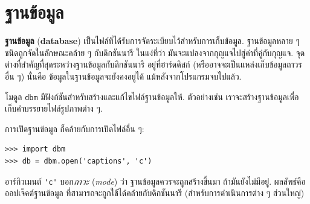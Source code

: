 \section{ฐานข้อมูล}


\textbf{ฐานข้อมูล} (\textbf{database}) เป็นไฟล์ที่ได้รับการจัดระเบียบไว้สำหรับการเก็บข้อมูล.
ฐานข้อมูลหลาย ๆ ชนิดถูกจัดในลักษณะคล้าย ๆ กับดิกชันนารี
ในแง่ที่ว่า มันจะแปลงจากกุญแจไปสู่ค่าที่คู่กับกุญแจ.
จุดต่างที่สำคัญที่สุดระหว่างฐานข้อมูลกับดิกชันนารี
อยู่ที่ฮาร์ดดิสก์ (หรืออาจจะเป็นแหล่งเก็บข้อมูลถาวรอื่น ๆ)
นั่นคือ ข้อมูลในฐานข้อมูลจะยังคงอยู่ได้ แม้หลังจากโปรแกรมจบไปแล้ว.


โมดูล \texttt{dbm} มีฟังก์ชันสำหรับสร้างและแก้ไขไฟล์ฐานข้อมูลให้.
ตัวอย่างเช่น เราจะสร้างฐานข้อมูลเพื่อเก็บคำบรรยายไฟล์รูปภาพต่าง ๆ.

การเปิดฐานข้อมูล ก็คล้ายกับการเปิดไฟล์อื่น ๆ:

\begin{verbatim}
>>> import dbm
>>> db = dbm.open('captions', 'c')
\end{verbatim}
%
%
อาร์กิวเมนต์ \verb|'c'| บอก\textit{ภาวะ} (\textit{mode}) ว่า
ฐานข้อมูลควรจะถูกสร้างขึ้นมา ถ้ามันยังไม่มีอยู่.
ผลลัพธ์คือ ออปเจ๊คต์ฐานข้อมูล ที่สามารถจะถูกใช้ได้คล้ายกับดิกชันนารี (สำหรับการดำเนินการต่าง ๆ ส่วนใหญ่)

